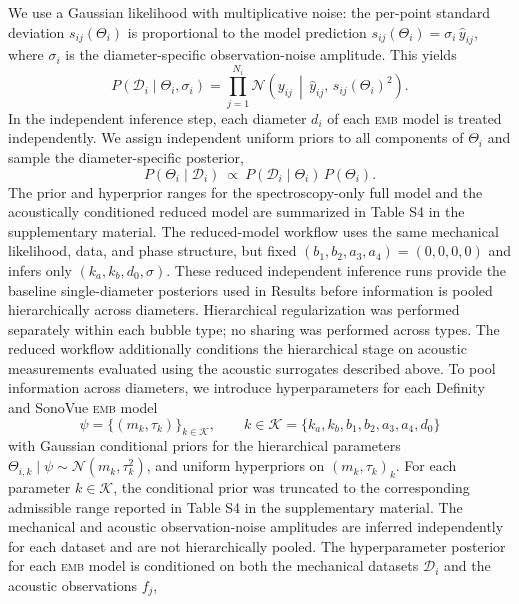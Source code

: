 \documentclass[%
 aip,
 jcp,
 amsmath,amssymb,
 preprint,%
]{revtex4-1}
\begin{document}
We use a Gaussian likelihood with multiplicative noise: the per-point standard deviation $s_{ij}(\Theta_{i})$ is proportional to the model prediction $s_{ij}(\Theta_{i}) = \sigma_{i}\,\hat{y}_{ij}$,
where $\sigma_i$ is the diameter-specific observation-noise amplitude. This yields
\begin{equation}
P(\mathcal{D}_i \mid \Theta_{i}, \sigma_i) = \prod_{j=1}^{N_i} \mathcal{N}\!\left(y_{ij} \,\middle|\, \hat{y}_{ij},\, s_{ij}(\Theta_{i})^2\right).
\end{equation}
In the independent inference step, each diameter $d_i$ of each \textsc{emb} model is treated independently. We assign independent uniform priors to all components of $\Theta_{i}$ and sample the diameter-specific posterior,
\begin{equation}
P(\Theta_{i} \mid \mathcal{D}_i)\ \propto\ P(\mathcal{D}_i \mid \Theta_{i})\,P(\Theta_{i}).
\end{equation}
The prior and hyperprior ranges for the spectroscopy-only full model and the acoustically conditioned reduced model are summarized in Table S4 in the supplementary material. The reduced-model workflow
  uses the same mechanical likelihood, data, and phase structure, but fixed $(b_1,b_2,a_3,a_4)=(0,0,0,0)$ and infers only $(k_a,k_b,d_0,\sigma)$. These
  reduced independent inference runs provide the baseline single-diameter posteriors used in Results before information is pooled hierarchically across
  diameters. Hierarchical regularization was performed separately within each bubble type; no sharing was performed across types. The reduced workflow
  additionally conditions the hierarchical stage on acoustic measurements evaluated using the acoustic surrogates described above. To
  pool information across diameters, we introduce hyperparameters for each Definity and
  SonoVue \textsc{emb} model
  \begin{equation}
  \psi = \{(m_k,\tau_k)\}_{k\in\mathcal{K}},\qquad
  k\in\mathcal{K}=\{k_a,k_b,b_1,b_2,a_3,a_4,d_0\}
  \end{equation}
  with Gaussian conditional priors for the hierarchical parameters $\Theta_{i,k}\mid\psi \sim \mathcal{N}(m_k,\tau_k^2)$, and uniform hyperpriors on
  $(m_k,\tau_k)_k$. For each parameter $k\in\mathcal{K}$, the conditional prior was truncated to the corresponding admissible range reported in Table
  S4 in the supplementary material. The mechanical and acoustic observation-noise amplitudes are inferred independently for each dataset and are not
  hierarchically pooled. The hyperparameter posterior for each \textsc{emb} model is conditioned on both the mechanical datasets $\mathcal{D}_i$ and the acoustic observations $f_j$,
\end{document}
